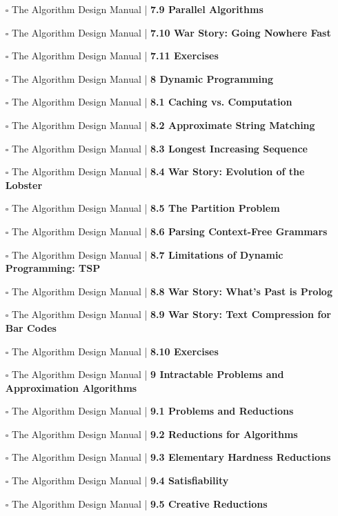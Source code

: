\documentclass[a4, landscape, 12pt]{article}
\newcommand{\checkbox}{$\square$}%
\begin{document}
\begin{itemize}
{}
\item [\checkbox]  The Algorithm Design Manual | \textbf{ 7.9 Parallel Algorithms
}
\item [\checkbox]  The Algorithm Design Manual | \textbf{ 7.10 War Story: Going Nowhere Fast
}
\item [\checkbox]  The Algorithm Design Manual | \textbf{ 7.11 Exercises
}
\item [\checkbox]  The Algorithm Design Manual | \textbf{ 8 Dynamic Programming
}
\item [\checkbox]  The Algorithm Design Manual | \textbf{ 8.1 Caching vs. Computation
}
\item [\checkbox]  The Algorithm Design Manual | \textbf{ 8.2 Approximate String Matching
}
\item [\checkbox]  The Algorithm Design Manual | \textbf{ 8.3 Longest Increasing Sequence
}
\item [\checkbox]  The Algorithm Design Manual | \textbf{ 8.4 War Story: Evolution of the Lobster
}
\item [\checkbox]  The Algorithm Design Manual | \textbf{ 8.5 The Partition Problem
}
\item [\checkbox]  The Algorithm Design Manual | \textbf{ 8.6 Parsing Context-Free Grammars
}
\item [\checkbox]  The Algorithm Design Manual | \textbf{ 8.7 Limitations of Dynamic Programming: TSP
}
\item [\checkbox]  The Algorithm Design Manual | \textbf{ 8.8 War Story: What’s Past is Prolog
}
\item [\checkbox]  The Algorithm Design Manual | \textbf{ 8.9 War Story: Text Compression for Bar Codes
}
\item [\checkbox]  The Algorithm Design Manual | \textbf{ 8.10 Exercises
}
\item [\checkbox]  The Algorithm Design Manual | \textbf{ 9 Intractable Problems and Approximation Algorithms
}
\item [\checkbox]  The Algorithm Design Manual | \textbf{ 9.1 Problems and Reductions
}
\item [\checkbox]  The Algorithm Design Manual | \textbf{ 9.2 Reductions for Algorithms
}
\item [\checkbox]  The Algorithm Design Manual | \textbf{ 9.3 Elementary Hardness Reductions
}
\item [\checkbox]  The Algorithm Design Manual | \textbf{ 9.4 Satisfiability
}
\item [\checkbox]  The Algorithm Design Manual | \textbf{ 9.5 Creative Reductions
}
\end{itemize}
\end{document}
